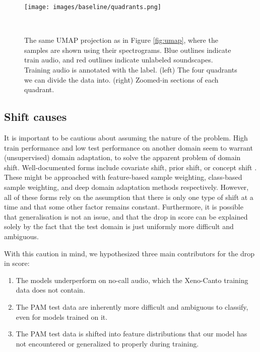 \begin{figure}[ht]
    \centering
    \begin{minipage}[t]{0.495\linewidth}
        \centering
        \texttt{[image: images/baseline/quadrants.png]}
    \end{minipage}%
    \begin{minipage}[t]{0.495\linewidth}
        \centering
        \vspace{-\linewidth}
        \\
    \end{minipage}
    \caption{The same UMAP projection as in Figure \ref{fig:umap}, where the samples are shown using their spectrograms. Blue outlines indicate train audio, and red outlines indicate unlabeled soundscapes. Training audio is annotated with the label. (left) The four quadrants we can divide the data into. (right) Zoomed-in sections of each quadrant.}
    \label{fig:quadrants}
\end{figure}

\subsection{Shift causes}
It is important to be cautious about assuming the nature of the problem. High train performance and low test performance on another domain seem to warrant (unsupervised) domain adaptation, to solve the apparent problem of domain shift. Well-documented forms include covariate shift, prior shift, or concept shift \cite{MORENOTORRES2012521}. These might be approached with feature-based sample weighting, class-based sample weighting, and deep domain adaptation methods respectively. However, all of these forms rely on the assumption that there is only one type of shift at a time and that some other factor remains constant. Furthermore, it is possible that generalisation is not an issue, and that the drop in score can be explained solely by the fact that the test domain is just uniformly more difficult and ambiguous. 

With this caution in mind, we hypothesized three main contributors for the drop in score:
\begin{enumerate}
    \item The models underperform on no-call audio, which the Xeno-Canto training data does not contain.
    \item The PAM test data are inherently more difficult and ambiguous to classify, even for models trained on it.
    \item The PAM test data is shifted into feature distributions that our model has not encountered or generalized to properly during training.
\end{enumerate}


